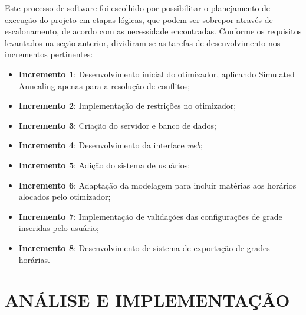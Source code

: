 Este processo de software foi escolhido por possibilitar o planejamento de execução do projeto em etapas lógicas, que podem ser sobrepor através de escalonamento, de acordo com as necessidade encontradas. Conforme os requisitos levantados na seção anterior, dividiram-se as tarefas de desenvolvimento nos incrementos pertinentes:
\begin{itemize}
	\item \textbf{Incremento 1}: Desenvolvimento inicial do otimizador, aplicando Simulated Annealing apenas para a resolução de conflitos;
	\item \textbf{Incremento 2}: Implementação de restrições no otimizador;
	\item \textbf{Incremento 3}: Criação do servidor e banco de dados;
	\item \textbf{Incremento 4}: Desenvolvimento da interface \textit{web};
	\item \textbf{Incremento 5}: Adição do sistema de usuários;
	\item \textbf{Incremento 6}: Adaptação da modelagem para incluir matérias aos horários alocados pelo otimizador;
	\item \textbf{Incremento 7}: Implementação de validações das configurações de grade inseridas pelo usuário;
	\item \textbf{Incremento 8}: Desenvolvimento de sistema de exportação de grades horárias.
\end{itemize}

\section{ANÁLISE E IMPLEMENTAÇÃO}
\label{sec:implementacao}









